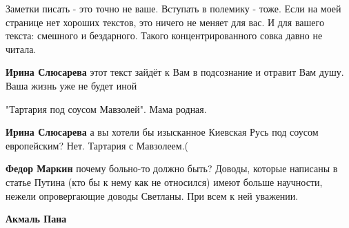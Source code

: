 \begin{itemize}
\begin{itemize}
 
Заметки писать - это точно не ваше. Вступать в полемику - тоже. Если на моей
странице нет хороших текстов, это ничего не меняет для вас. И для вашего
текста: смешного и бездарного. Такого концентрированного совка давно не читала.


 
\textbf{Ирина Слюсарева} этот текст зайдёт к Вам в подсознание и отравит Вам душу. Ваша жизнь уже не будет иной

 
"Тартария под соусом Мавзолей". Мама родная.

 
\textbf{Ирина Слюсарева} а вы хотели бы изысканное Киевская Русь под соусом европейским?
Нет. Тартария с Мавзолеем.(

 
\textbf{Федор Маркин} почему больно-то должно быть? Доводы, которые написаны в статье Путина (кто бы к нему как не относился) имеют больше научности, нежели опровергающие доводы Светланы. При всем к ней уважении.

 
\textbf{Акмаль Пана} 


\end{itemize}
\end{itemize}
